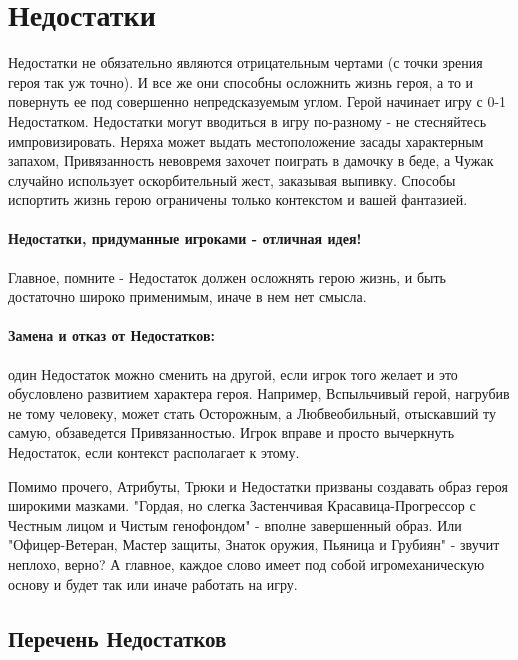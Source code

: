 \section{Недостатки}
Недостатки не обязательно являются отрицательным чертами (с точки зрения героя так уж точно). И все же они способны осложнить жизнь героя, а то и повернуть ее под совершенно непредсказуемым углом. Герой начинает игру с 0-1 Недостатком.
\newline Недостатки могут вводиться в игру по-разному - не стесняйтесь импровизировать. Неряха может выдать местоположение засады характерным запахом, Привязанность невовремя захочет поиграть в дамочку в беде, а Чужак случайно использует оскорбительный жест, заказывая выпивку. Способы испортить жизнь герою ограничены только контекстом и вашей фантазией.
\paragraph{Недостатки, придуманные игроками - отличная идея!} Главное, помните - Недостаток должен осложнять герою жизнь, и быть достаточно широко применимым, иначе в нем нет смысла.
\paragraph{Замена и отказ от Недостатков:} один Недостаток можно сменить на другой, если игрок того желает и это обусловлено развитием характера героя. Например, Вспыльчивый герой, нагрубив не тому человеку, может стать Осторожным, а Любвеобильный, отыскавший ту самую, обзаведется Привязанностью. Игрок вправе и просто вычеркнуть Недостаток, если контекст располагает к этому.
\begin{tcolorbox}
    Помимо прочего, Атрибуты, Трюки и Недостатки призваны создавать образ героя широкими мазками. "Гордая, но слегка Застенчивая Красавица-Прогрессор с Честным лицом и Чистым генофондом" - вполне завершенный образ. Или "Офицер-Ветеран, Мастер защиты, Знаток оружия, Пьяница и Грубиян" - звучит неплохо, верно? А главное, каждое слово имеет под собой игромеханическую основу и будет так или иначе работать на игру.
\end{tcolorbox}
\subsection{Перечень Недостатков}
